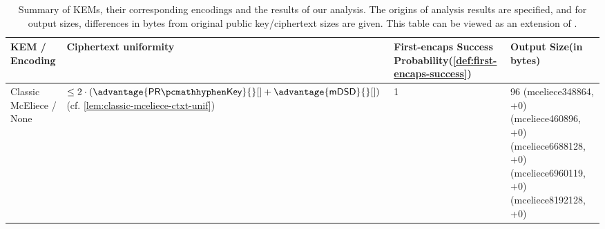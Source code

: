 \begin{table}
    \centering
    \footnotesize\raggedright
    \begin{tabular}{@{} L{0.2\textwidth-\tabcolsep} | L{0.32\tabcolsep} L{0.2\tabcolsep} L{0.28\textwidth-\tabcolsep} @{}}
        \textbf{KEM /\newline Encoding} & \textbf{Ciphertext uniformity} & \textbf{First-encaps Success Probability}\newline (\cref{def:first-encaps-success}) & \textbf{Output Size}\newline (in bytes)\\ \hline
               
        Classic McEliece \cite{NISTPQC-R4:ClassicMcEliece22} \newline/ None
        & $\leq 2 \cdot \left( \advantage{\prkey}{}[] + \advantage{\mdsd}{}[] \right)$\newline (cf. \cref{lem:classic-mceliece-ctxt-unif})
        & 1
        & 96 (\textsf{mceliece348864}, +0) (\textsf{mceliece460896}, +0) (\textsf{mceliece6688128}, +0) (\textsf{mceliece6960119}, +0) (\textsf{mceliece8192128}, +0)\newline \\
    \end{tabular}
    \caption[
        Summary of KEMs, their corresponding encodings and the results of our analysis.
    ]{
        Summary of KEMs, their corresponding encodings and the results of our analysis. The origins of analysis results are specified, and for output sizes, differences in bytes from original public key/ciphertext sizes are given. This table can be viewed as an extension of \cite[Table~2]{CCS:GunSteVei24}.}
    \label{tab:obfuscation-summary}
\end{table}
